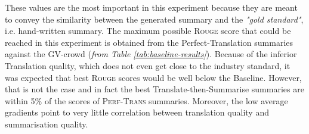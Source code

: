 \documentclass[12pt,a4paper,twoside,openright]{report}
\newcommand{\rouge}{\textsc{Rouge} }
\newcommand{\perftrans}{\textsc{Perf-Trans} }
\begin{document}
These values are the most important in this experiment because they are meant to convey the similarity between the generated summary and the \textit{"gold standard"}, i.e. hand-written summary. The maximum possible \rouge score that could be reached in this experiment is obtained from the Perfect-Translation summaries against the GV-crowd (\textit{from Table \ref{tab:baseline-results}}). Because of the inferior Translation quality, which does not even get close to the industry standard, it was expected that best \rouge scores would be well below the Baseline. However, that is not the case and in fact the best Translate-then-Summarise summaries are within 5\% of the scores of \perftrans summaries. Moreover, the low average gradients point to very little correlation between translation quality and summarisation quality.
\end{document}
